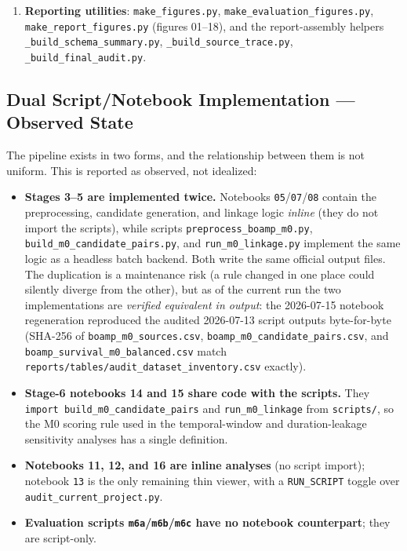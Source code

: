\documentclass[11pt]{article}
\begin{document}
\begin{enumerate}
  \texttt{eval\_m4\_*}), threshold/ablation/variant-KM sensitivity
  (\texttt{eval\_m6a/b/c\_*}, script-only), temporal-window sensitivity
  (notebook \texttt{14} / \texttt{eval\_m6d\_*}), duration leakage
  (notebook \texttt{15} / \texttt{eval\_duration\_leakage.py}), and the
  survival analysis (notebook \texttt{16} /
  \texttt{run\_survival\_analysis.py}). Sensitivity runs write their own
  link/survival datasets (\texttt{boamp\_m0\_links\_window\_*m.csv},
  \texttt{boamp\_survival\_m0\_*.csv}) --- these are sensitivity artifacts,
  not replacements for the balanced reference handoff.
  \item \textbf{Reporting utilities}: \texttt{make\_figures.py},
  \texttt{make\_evaluation\_figures.py}, \texttt{make\_report\_figures.py}
  (figures 01--18), and the report-assembly helpers
  \texttt{\_build\_schema\_summary.py}, \texttt{\_build\_source\_trace.py},
  \texttt{\_build\_final\_audit.py}.
\end{enumerate}

\subsection{Dual Script/Notebook Implementation --- Observed State}
\label{sec:dualimpl}
The pipeline exists in two forms, and the relationship between them is not
uniform. This is reported as observed, not idealized:
\begin{itemize}
  \item \textbf{Stages 3--5 are implemented twice.} Notebooks
  \texttt{05}/\texttt{07}/\texttt{08} contain the preprocessing, candidate
  generation, and linkage logic \emph{inline} (they do not import the
  scripts), while scripts \texttt{preprocess\_boamp\_m0.py},
  \texttt{build\_m0\_candidate\_pairs.py}, and \texttt{run\_m0\_linkage.py}
  implement the same logic as a headless batch backend. Both write the same
  official output files. The duplication is a maintenance risk (a rule
  changed in one place could silently diverge from the other), but as of
  the current run the two implementations are \emph{verified equivalent in
  output}: the 2026-07-15 notebook regeneration reproduced the audited
  2026-07-13 script outputs byte-for-byte (SHA-256 of
  \texttt{boamp\_m0\_sources.csv}, \texttt{boamp\_m0\_candidate\_pairs.csv},
  and \texttt{boamp\_survival\_m0\_balanced.csv} match
  \texttt{reports/tables/audit\_dataset\_inventory.csv} exactly).
  \item \textbf{Stage-6 notebooks 14 and 15 share code with the scripts.}
  They \texttt{import build\_m0\_candidate\_pairs} and
  \texttt{run\_m0\_linkage} from \texttt{scripts/}, so the M0 scoring rule
  used in the temporal-window and duration-leakage sensitivity analyses has
  a single definition.
  \item \textbf{Notebooks 11, 12, and 16 are inline analyses} (no script
  import); notebook \texttt{13} is the only remaining thin viewer, with a
  \texttt{RUN\_SCRIPT} toggle over \texttt{audit\_current\_project.py}.
  \item \textbf{Evaluation scripts \texttt{m6a}/\texttt{m6b}/\texttt{m6c}
  have no notebook counterpart}; they are script-only.
\end{itemize}
\end{document}
